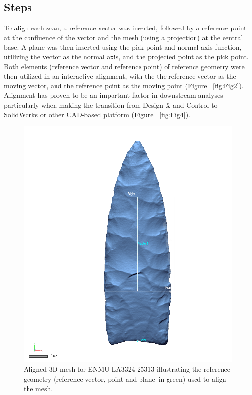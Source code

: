 \documentclass[preprint,12pt]{elsarticle}
\begin{document}
\subsection{Steps}

To align each scan, a reference vector was inserted, followed by a reference point at the confluence of the vector and the mesh (using a projection) at the central base. A plane was then inserted using the pick point and normal axis function, utilizing the vector as the normal axis, and the projected point as the pick point. Both elements (reference vector and reference point) of reference geometry were then utilized in an interactive alignment, with the the reference vector as the moving vector, and the reference point as the moving point (Figure ~\ref{fig:Fig2}). Alignment has proven to be an important factor in downstream analyses, particularly when making the transition from Design X and Control to SolidWorks or other CAD-based platform \cite{Selden:5} (Figure ~\ref{fig:Fig4}). 

\begin{figure}[ht]\centering
\includegraphics[width=\linewidth]{Fig3}
\caption{Aligned 3D mesh for ENMU LA3324 25313 illustrating the reference geometry (reference vector, point and plane--in green) used to align the mesh.}
\label{fig:Fig3}
\end{figure}
\end{document}

